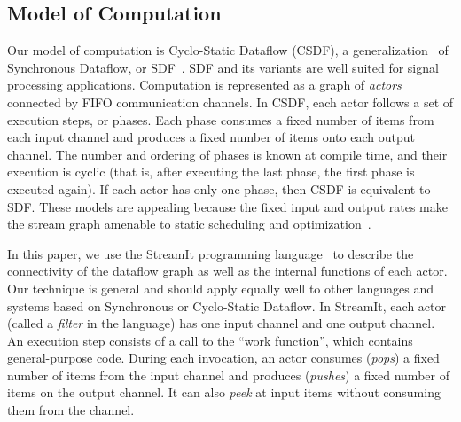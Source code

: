 
\subsection{Model of Computation}
\label{sec:sdf}


Our model of computation is Cyclo-Static Dataflow (CSDF), a
generalization~\cite{BELP96} of Synchronous Dataflow, or
SDF~\cite{LM87-i}.  SDF and its variants are well suited for signal
processing applications. Computation is represented as a graph of {\it
actors} connected by FIFO communication channels.  In CSDF, each actor
follows a set of execution steps, or phases.  Each phase consumes a
fixed number of items from each input channel and produces a fixed
number of items onto each output channel.  The number and ordering of
phases is known at compile time, and their execution is cyclic (that
is, after executing the last phase, the first phase is executed
again).  If each actor has only one phase, then CSDF is equivalent to
SDF.  These models are appealing because the fixed input and output
rates make the stream graph amenable to static scheduling and
optimization~\cite{LM87-i}.

In this paper, we use the StreamIt programming
language~\cite{streamitcc} to describe the connectivity of the
dataflow graph as well as the internal functions of each actor.  Our
technique is general and should apply equally well to other languages
and systems based on Synchronous or Cyclo-Static Dataflow.  In
StreamIt, each actor (called a {\it filter} in the language) has one
input channel and one output channel.  An execution step consists of a
call to the ``work function'', which contains general-purpose code.
During each invocation, an actor consumes ({\it pops}) a fixed number
of items from the input channel and produces ({\it pushes}) a fixed
number of items on the output channel.  It can also {\it peek} at
input items without consuming them from the channel.

